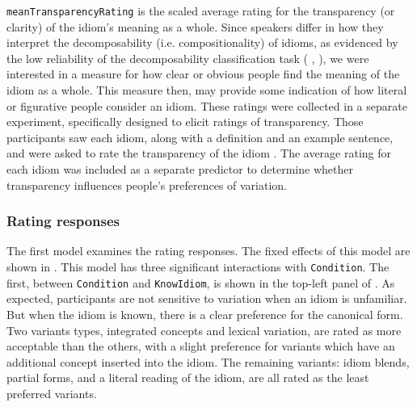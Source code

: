 \documentclass[output=paper
,modfonts
,nonflat]{langsci/langscibook}
\begin{document}
\texttt{meanTransparencyRating} is the scaled average rating for the transparency (or clarity) of the idiom's meaning as a whole. Since speakers differ in how they interpret the decomposability (i.e. compositionality) of idioms, as evidenced by the low reliability of the decomposability classification task (\citeauthor{TitoneConnine1994} \citeyear*{TitoneConnine1994}, \citeauthor*{TabossiEtAl2008} \citeyear*{TabossiEtAl2008}), we were interested in a measure for how clear or obvious people find the meaning of the idiom as a whole. This measure then, may provide some indication of how literal or figurative people consider an idiom. These ratings were collected in a separate experiment, specifically designed to elicit ratings of transparency. Those participants saw each idiom, along with a definition and an example sentence, and were asked to rate the transparency of the idiom \citep[for further details, see][]{Geeraert2016}. The average rating for each idiom was included as a separate predictor to determine whether transparency influences people's preferences of variation.

\subsubsection{Rating responses}

The first model examines the rating responses. The fixed effects of this model are shown in . This model has three significant interactions with \texttt{Condition}. The first, between \texttt{Condition} and \texttt{KnowIdiom}, is shown in the top-left panel of . As expected, participants are not sensitive to variation when an idiom is unfamiliar. But when the idiom is known, there is a clear preference for the canonical form. Two variants types, integrated concepts and lexical variation, are rated as more acceptable than the others, with a slight preference for variants which have an additional concept inserted into the idiom. The remaining variants: idiom blends, partial forms, and a literal reading of the idiom, are all rated as the least preferred variants.
\end{document}
